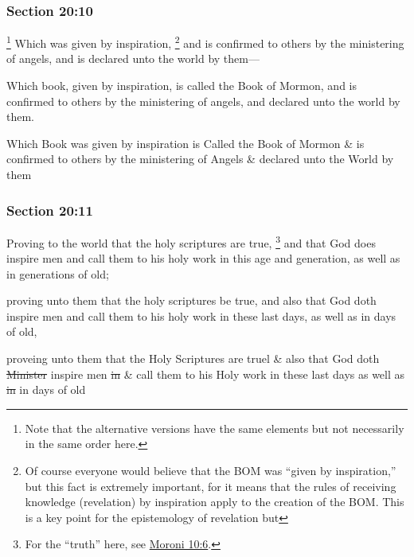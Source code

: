 	\subsubsection{Section 20:10} %
		\label{DC20-10}

			\footnote{%
				Note that the alternative versions have the same elements but not necessarily in the same order here.
				}%
		Which was given by inspiration,%
			\footnote{%
				Of course everyone would believe that the BOM was ``given by inspiration,'' but this fact is extremely important, for it means that the rules of receiving knowledge (revelation) by inspiration apply to the creation of the BOM. This is a key point for the epistemology of revelation but 
				}
		and is confirmed to others by the ministering of angels, and is declared unto the world by them---

		\begin{framed}
		\scriptsize
			\begin{compactdesc}
				\item[JSP] Which book, given by inspiration, is called the Book of Mormon, and is confirmed to others by the ministering of angels, and declared unto the world by them.
				\item[RB1] Which Book was given by inspiration is Called the Book of Mormon \& is confirmed to others by the ministering of Angels \& declared unto the World by them
			\end{compactdesc}
		\end{framed}

	\subsubsection{Section 20:11} %
		\label{DC20-11}

		Proving to the world that the holy scriptures are true,%
			\footnote{%
				For the ``truth'' here, see \hyperref[MORONI-10-6]{Moroni 10:6}.
				}
		and that God does inspire men and call them to his holy work in this age and generation, as well as in generations of old;

		\begin{framed}
		\scriptsize
			\begin{compactdesc}
				\item[JSP] proving unto them that the holy scriptures be true, and also that God doth inspire men and call them to his holy work in these last days, as well as in days of old,
				\item[RB1] proveing unto them that the Holy Scriptures are truel \& also that God doth \sout{Minister} inspire men \sout{in} \& call them to his Holy work in these last days as well as \sout{in} in days of old
			\end{compactdesc}
		\end{framed}

